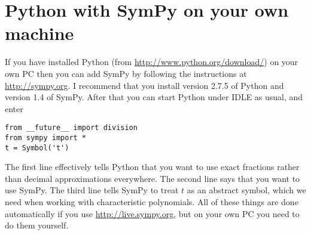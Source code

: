 \documentclass{amsart}
\begin{document}
\section*{Python with SymPy on your own machine}

If you have installed Python (from \url{http://www.python.org/download/})
on your own PC then you can add SymPy by following the instructions at
\url{http://sympy.org}.  I recommend that you install version 2.7.5 of
Python and version 1.4 of SymPy.  After that you can start Python
under IDLE as usual, and enter  
\begin{verbatim}
from __future__ import division
from sympy import *
t = Symbol('t')
\end{verbatim}
The first line effectively tells Python that you want to use exact
fractions rather than decimal approximations everywhere.  The second
line says that you want to use SymPy.  The third line tells SymPy to
treat $t$ as an abstract symbol, which we need when working with
characteristic polynomials.  All of these things are done
automatically if you use \url{http://live.sympy.org}, but on your own
PC you need to do them yourself.
\end{document}

